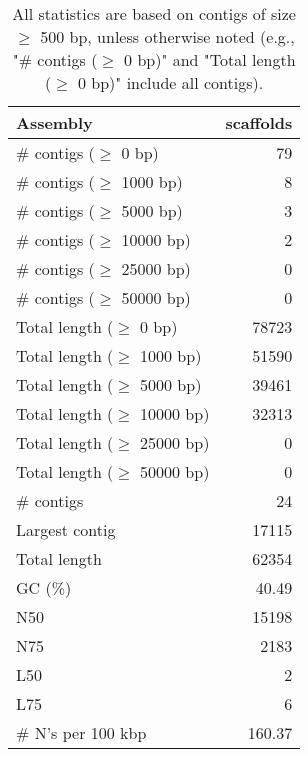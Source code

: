 \documentclass[12pt,a4paper]{article}
\begin{document}
\begin{table}[ht]
\begin{center}
\caption{All statistics are based on contigs of size $\geq$ 500 bp, unless otherwise noted (e.g., "\# contigs ($\geq$ 0 bp)" and "Total length ($\geq$ 0 bp)" include all contigs).}
\begin{tabular}{|l*{1}{|r}|}
\hline
Assembly & scaffolds \\ \hline
\# contigs ($\geq$ 0 bp) & 79 \\ \hline
\# contigs ($\geq$ 1000 bp) & 8 \\ \hline
\# contigs ($\geq$ 5000 bp) & 3 \\ \hline
\# contigs ($\geq$ 10000 bp) & 2 \\ \hline
\# contigs ($\geq$ 25000 bp) & 0 \\ \hline
\# contigs ($\geq$ 50000 bp) & 0 \\ \hline
Total length ($\geq$ 0 bp) & 78723 \\ \hline
Total length ($\geq$ 1000 bp) & 51590 \\ \hline
Total length ($\geq$ 5000 bp) & 39461 \\ \hline
Total length ($\geq$ 10000 bp) & 32313 \\ \hline
Total length ($\geq$ 25000 bp) & 0 \\ \hline
Total length ($\geq$ 50000 bp) & 0 \\ \hline
\# contigs & 24 \\ \hline
Largest contig & 17115 \\ \hline
Total length & 62354 \\ \hline
GC (\%) & 40.49 \\ \hline
N50 & 15198 \\ \hline
N75 & 2183 \\ \hline
L50 & 2 \\ \hline
L75 & 6 \\ \hline
\# N's per 100 kbp & 160.37 \\ \hline
\end{tabular}
\end{center}
\end{table}
\end{document}
